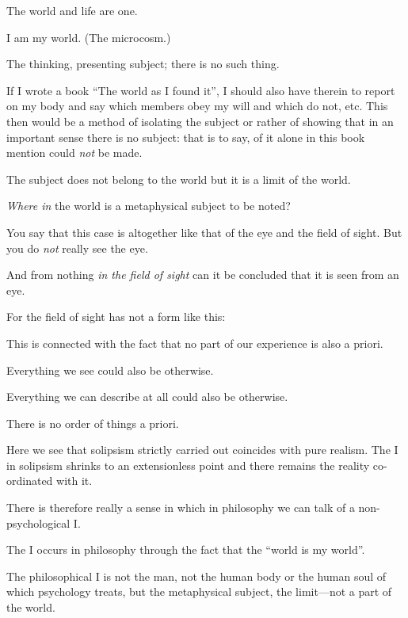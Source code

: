 {The world and life are one.}


{I am my world. (The microcosm.)}


{The thinking, presenting subject; there is no
such thing.

If I wrote a book ``The world as I found it'',
I should also have therein to report on my body
and say which members obey my will and which
do not, etc. This then would be a method of
isolating the subject or rather of showing that in
an important sense there is no subject: that is to
say, of it alone in this book mention could \emph{not} be
made.}


{The subject does not belong to the world but
it is a limit of the world.}


{\emph{Where in} the world is a metaphysical subject to
be noted?

You say that this case is altogether like that of
the eye and the field of sight. But you do \emph{not}
really see the eye.

And from nothing \emph{in the field of sight} can it be
concluded that it is seen from an eye.}


{For the field of sight has not a form like this:
}


{This is connected with the fact that no part of
our experience is also a priori.

Everything we see could also be otherwise.

Everything we can describe at all could also be
otherwise.

There is no order of things a priori.}


{Here we see that solipsism strictly carried out
coincides with pure realism. The I in solipsism
shrinks to an extensionless point and there remains
the reality co-ordinated with it.}


{There is therefore really a sense in which in
philosophy we can talk of a non-psy\-cho\-log\-i\-cal I.

The I occurs in philosophy through the fact
that the ``world is my world''.

The philosophical I is not the man, not the
human body or the human soul of which psychology
treats, but the metaphysical subject, the
limit---not a part of the world.}
